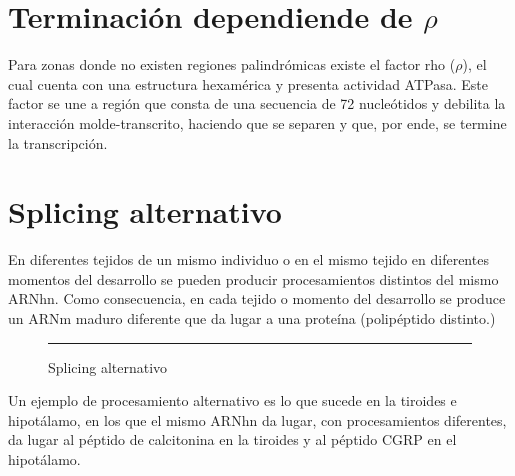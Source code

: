 \section{Terminación dependiende de $\rho$}

Para zonas donde no existen regiones palindrómicas existe el factor rho ($\rho$), el cual cuenta con una estructura hexamérica y presenta actividad ATPasa.
Este factor se une a región que consta de una secuencia de 72 nucleótidos y debilita la interacción molde-transcrito, haciendo que se separen y que, por ende, se termine la transcripción.

\section{Splicing alternativo}

En diferentes tejidos de un mismo individuo o en el mismo tejido en diferentes momentos del desarrollo se pueden producir procesamientos distintos del mismo ARNhn. Como consecuencia, en cada tejido o momento del desarrollo se produce un ARNm maduro diferente que da lugar a una proteína (polipéptido distinto.)

\begin{figure}[H]\centering
    \resizebox{\linewidth}{!}{}
    \rule{\linewidth}{0.5pt}
    \caption{Splicing alternativo}
    \label{fig:splicing_alt}
\end{figure}

Un ejemplo de procesamiento alternativo es lo que sucede en la tiroides e hipotálamo, en los que el mismo ARNhn da lugar, con procesamientos diferentes, da lugar al péptido de calcitonina en la tiroides y al péptido CGRP en el hipotálamo.